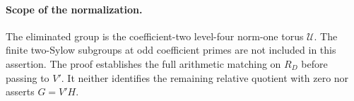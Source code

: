 \paragraph{Scope of the normalization.}
The eliminated group is the coefficient-two level-four norm-one
torus \(\mathcal U\). The finite two-Sylow subgroups at odd coefficient
primes are not included in this assertion. The proof establishes
the full arithmetic matching on \(R_D\) before passing to \(V'\).
It neither identifies the remaining relative quotient with zero
nor asserts \(G=V'H\).
